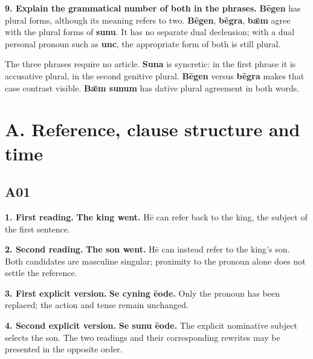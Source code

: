 \textbf{9. Explain the grammatical number of both in the phrases.} \textbf{Bēgen} has plural forms, although its meaning refers to two. \textbf{Bēgen}, \textbf{bēgra}, \textbf{bǣm} agree with the plural forms of \textbf{sunu}. It has no separate dual declension; with a dual personal pronoun such as \textbf{unc}, the appropriate form of both is still plural.

The three phrases require no article. \textbf{Suna} is syncretic: in the first phrase it is accusative plural, in the second genitive plural. \textbf{Bēgen} versus \textbf{bēgra} makes that case contrast visible. \textbf{Bǣm sunum} has dative plural agreement in both words.

\section*{A. Reference, clause structure and time}

\subsection*{A01}

\textbf{1. First reading.} \textbf{The king went.} Hē can refer back to the king, the subject of the first sentence.

\textbf{2. Second reading.} \textbf{The son went.} Hē can instead refer to the king’s son. Both candidates are masculine singular; proximity to the pronoun alone does not settle the reference.

\textbf{3. First explicit version.} \textbf{Se cyning ēode.} Only the pronoun has been replaced; the action and tense remain unchanged.

\textbf{4. Second explicit version.} \textbf{Se sunu ēode.} The explicit nominative subject selects the son. The two readings and their corresponding rewrites may be presented in the opposite order.


